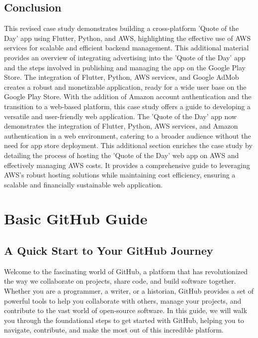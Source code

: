 \documentclass{book}
\begin{document}
\section{Conclusion}
This revised case study demonstrates building a cross-platform 'Quote of the Day' app using Flutter, Python, and AWS, highlighting the effective use of AWS services for scalable and efficient backend management.
This additional material provides an overview of integrating advertising into the 'Quote of the Day' app and the steps involved in publishing and managing the app on the Google Play Store. The integration of Flutter, Python, AWS services, and Google AdMob creates a robust and monetizable application, ready for a wide user base on the Google Play Store. With the addition of Amazon account authentication and the transition to a web-based platform, this case study offers a guide to developing a versatile and user-friendly web application. The 'Quote of the Day' app now demonstrates the integration of Flutter, Python, AWS services, and Amazon authentication in a web environment, catering to a broader audience without the need for app store deployment. This additional section enriches the case study by detailing the process of hosting the 'Quote of the Day' web app on AWS and effectively managing AWS costs. It provides a comprehensive guide to leveraging AWS's robust hosting solutions while maintaining cost efficiency, ensuring a scalable and financially sustainable web application.



\clearpage
{}
\appendix
\renewcommand{\thechapter}{\Roman{chapter}} %

\chapter{Basic GitHub Guide}
\section*{A Quick Start to Your GitHub Journey}

Welcome to the fascinating world of GitHub, a platform that has revolutionized the way we collaborate on projects, share code, and build software together. Whether you are a programmer, a writer, or a historian, GitHub provides a set of powerful tools to help you collaborate with others, manage your projects, and contribute to the vast world of open-source software. In this guide, we will walk you through the foundational steps to get started with GitHub, helping you to navigate, contribute, and make the most out of this incredible platform.
\end{document}
